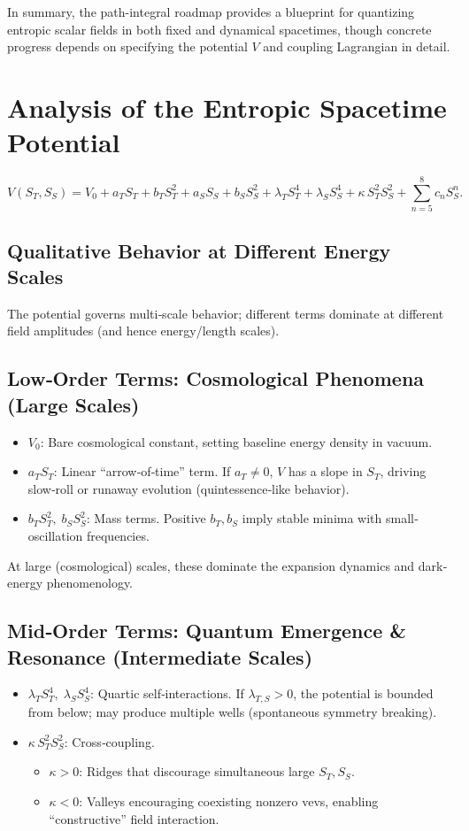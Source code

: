 \documentclass[11pt,a4paper]{article} %
\begin{document}
In summary, the path-integral roadmap provides a blueprint for quantizing entropic scalar fields in both fixed and dynamical spacetimes, though concrete progress depends on specifying the potential \(V\) and coupling Lagrangian in detail. 

\section{Analysis of the Entropic Spacetime Potential}
\begin{equation}
V(S_T,S_S)=V_0 + a_T S_T + b_T S_T^2 + a_S S_S + b_S S_S^2 
  + \lambda_T S_T^4 + \lambda_S S_S^4 + \kappa\,S_T^2 S_S^2
  + \sum_{n=5}^8 c_n S_S^n.
\end{equation}

\subsection{Qualitative Behavior at Different Energy Scales}
The potential governs multi‐scale behavior; different terms dominate at different field amplitudes (and hence energy/length scales).

\subsection{Low‐Order Terms: Cosmological Phenomena (Large Scales)}
\begin{itemize}
  \item $V_0$: Bare cosmological constant, setting baseline energy density in vacuum.
  \item $a_T S_T$: Linear “arrow‐of‐time” term. If $a_T \neq 0$, $V$ has a slope in $S_T$, driving slow‐roll or runaway evolution (quintessence‐like behavior).
  \item $b_T S_T^2,\;b_S S_S^2$: Mass terms. Positive $b_T,b_S$ imply stable minima with small‐oscillation frequencies.
\end{itemize}

At large (cosmological) scales, these dominate the expansion dynamics and dark‐energy phenomenology.

\subsection{Mid‐Order Terms: Quantum Emergence \& Resonance (Intermediate Scales)}
\begin{itemize}
  \item $\lambda_T S_T^4,\;\lambda_S S_S^4$: Quartic self‐interactions. If $\lambda_{T,S}>0$, the potential is bounded from below; may produce multiple wells (spontaneous symmetry breaking).
  \item $\kappa\,S_T^2 S_S^2$: Cross‐coupling. 
    \begin{itemize}
      \item $\kappa>0$: Ridges that discourage simultaneous large $S_T,S_S$.
      \item $\kappa<0$: Valleys encouraging coexisting nonzero vevs, enabling “constructive” field interaction.
    \end{itemize}
\end{itemize}
\end{document}

